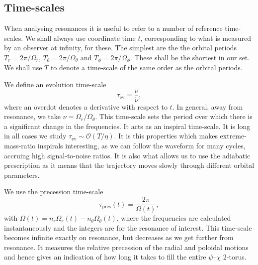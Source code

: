 \documentclass[aps,prd,amsfonts,amssymb,amsmath,nofootinbib,reprint,showpacs]{revtex4-1}
\newcommand{\sub}[1]{\ensuremath{_\text{#1}}}
\newcommand{\order}[1]{\ensuremath{\mathcal{O}({#1})}}
\begin{document}
\subsection{Time-scales}

When analysing resonances it is useful to refer to a number of reference time-scales. We shall always use coordinate time $t$, corresponding to what is measured by an observer at infinity, for these. The simplest are the the orbital periods $T_r = 2\pi/\Omega_r$, $T_\theta = 2\pi/\Omega_\theta$ and $T_\phi = 2\pi/\Omega_\phi$. These shall be the shortest in our set. We shall use $T$ to denote a time-scale of the same order as the orbital periods.

We define an evolution time-scale
\begin{equation}
\tau\sub{ev} = \frac{\nu}{\dot{\nu}},
\end{equation}
where an overdot denotes a derivative with respect to $t$. In general, away from resonance, we take $\nu = \Omega_r/\Omega_\theta$. This time-scale sets the period over which there is a significant change in the frequencies. It acts as an inspiral time-scale. It is long in all cases we study $\tau\sub{ev} \sim \order{T/\eta}$. It is this properties which makes extreme-mass-ratio inspirals interesting, as we can follow the waveform for many cycles, accruing high signal-to-noise ratios. It is also what allows us to use the adiabatic prescription as it means that the trajectory moves slowly through different orbital parameters.

We use the precession time-scale
\begin{equation}
\tau\sub{pres}(t) = \frac{2\pi}{\Omega(t)},
\label{eq:t-pres}
\end{equation}
with $\Omega(t) = n_r \Omega_r(t) - n_\theta \Omega_\theta(t)$, where the frequencies are calculated instantaneously and the integers are for the resonance of interest. This time-scale becomes infinite exactly on resonance, but decreases as we get further from resonance. It measures the relative precession of the radial and poloidal motions and hence gives an indication of how long it takes to fill the entire $\psi$--$\chi$ $2$-torus.
\end{document}
